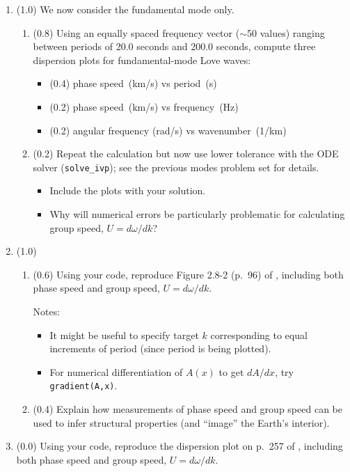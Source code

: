 \documentclass[11pt,titlepage,fleqn]{article}
\newcommand{\sfind}{{\tt solve\_ivp}}
\begin{document}
\begin{enumerate}

\item (1.0) We now consider the fundamental mode only.

\begin{enumerate}
\item (0.8) Using an equally spaced frequency vector ($\sim$50 values) ranging between periods of 20.0 seconds and 200.0 seconds, compute three dispersion plots for fundamental-mode Love waves:
%
\begin{itemize}
\item (0.4) phase speed~(km/s) vs period~(s)
\item (0.2) phase speed~(km/s) vs frequency~(Hz)
\item (0.2) angular frequency (rad/s) vs wavenumber~(1/km)
\end{itemize}

\item (0.2) Repeat the calculation but now use lower tolerance with the ODE solver (\sfind); see the previous modes problem set for details.
%
\begin{itemize}
\item Include the plots with your solution.
\item Why will numerical errors be particularly problematic for calculating group speed, $U = d\omega/dk$?
\end{itemize}

\end{enumerate}


\item (1.0)
%
\begin{enumerate}
\item (0.6) Using your code, reproduce Figure 2.8-2 (p.~96) of \citet{SteinWysession}, including both phase speed and group speed, $U = d\omega/dk$.

Notes:
%
\begin{itemize}
\item It might be useful to specify target $k$ corresponding to equal increments of period (since period is being plotted).
\item For numerical differentiation of $A(x)$ to get $dA/dx$, try \verb+gradient(A,x)+.
\end{itemize}

\item (0.4) Explain how measurements of phase speed and group speed can be used to infer structural properties (and ``image'' the Earth's interior).
\end{enumerate}


\item (0.0) Using your code, reproduce the dispersion plot on p.~257 of \citet{AkiRichardsE2}, including both phase speed and group speed, $U = d\omega/dk$.


\end{enumerate}
\end{document}
